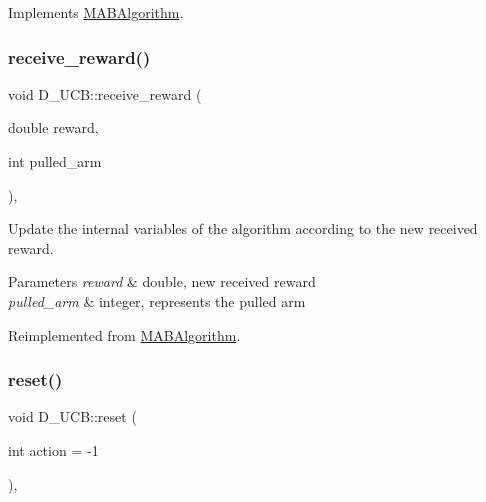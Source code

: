 Implements \mbox{\hyperlink{class_m_a_b_algorithm_afb48f01df0e1860d19759f6e20335007}{M\+A\+B\+Algorithm}}.

\mbox{\label{class_d___u_c_b_a23b79f3f23095ae6e824b36a3856ff7c}} 
\subsubsection{\texorpdfstring{receive\+\_\+reward()}{receive\_reward()}}
{\footnotesize\ttfamily void D\+\_\+\+U\+C\+B\+::receive\+\_\+reward (\begin{DoxyParamCaption}\item[{double}]{reward,  }\item[{int}]{pulled\+\_\+arm }\end{DoxyParamCaption})\hspace{0.3cm}{\ttfamily [override]}, {\ttfamily [virtual]}}



Update the internal variables of the algorithm according to the new received reward. 


\begin{DoxyParams}{Parameters}
{\em reward} & double, new received reward \\
\hline
{\em pulled\+\_\+arm} & integer, represents the pulled arm \\
\hline
\end{DoxyParams}


Reimplemented from \mbox{\hyperlink{class_m_a_b_algorithm_aa584b3d6b86fa050e3389be9781b5782}{M\+A\+B\+Algorithm}}.

\mbox{\label{class_d___u_c_b_a454ffcd1e17989f0b049790cfc5fc515}} 
\subsubsection{\texorpdfstring{reset()}{reset()}}
{\footnotesize\ttfamily void D\+\_\+\+U\+C\+B\+::reset (\begin{DoxyParamCaption}\item[{int}]{action = {\ttfamily -\/1} }\end{DoxyParamCaption})\hspace{0.3cm}{\ttfamily [override]}, {\ttfamily [virtual]}}



